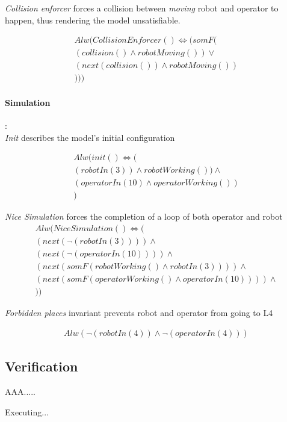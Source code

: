 \textit{Collision enforcer} forces a collision between \textit{moving} robot and operator to happen, thus rendering the model unsatisfiable.

\begin{align*}
	Alw(CollisionEnforcer()\iff (somF(\\
	(collision() \land robotMoving())\lor\\
	(next(collision()) \land robotMoving())\\
	)))
\end{align*}


\paragraph{Simulation}:\\

\textit{Init} describes the model's initial configuration

\begin{align*}
	Alw(init()\iff (\\
	(robotIn(3))\land robotWorking())\land \\
	(operatorIn(10)\land operatorWorking()) \\
	)
\end{align*}


\textit{Nice Simulation} forces the completion of a loop of both operator and robot
\begin{align*}
	Alw(NiceSimulation()\iff (\\
	(next(\neg(robotIn(3)))) \land \\
	(next(\neg(operatorIn(10)))) \land \\
	(next(somF(robotWorking()\land robotIn(3)))) \land \\
	(next(somF(operatorWorking()\land operatorIn(10)))) \land \\
	))
\end{align*}

\textit{Forbidden places} invariant prevents robot and operator from going to L4

\begin{align*}
	Alw(\neg(robotIn(4)) \land \neg(operatorIn(4)))
\end{align*}


\subsection{Verification}
AAA.....
\vspace{10mm}

Executing...